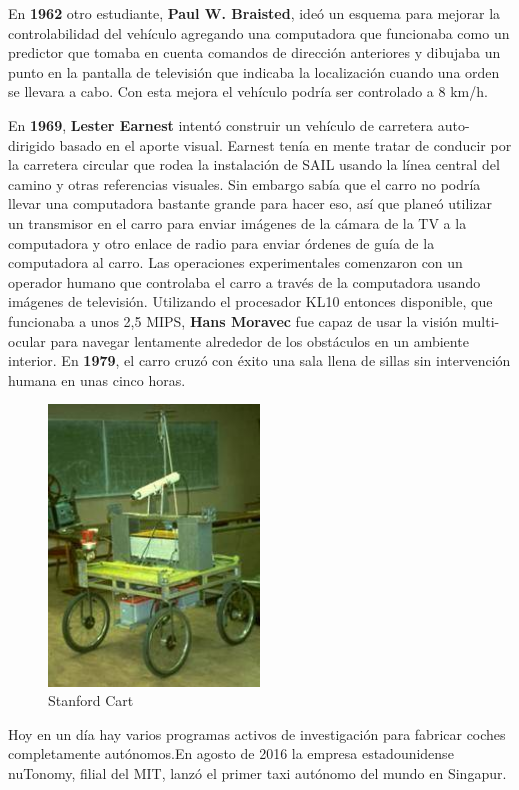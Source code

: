 \documentclass[a4paper, 11pt]{article} %
\begin{document}
En \textbf{1962} otro estudiante, \textbf{Paul W. Braisted}, ideó un esquema para mejorar la controlabilidad del vehículo agregando una computadora que funcionaba como un predictor que tomaba en cuenta comandos de dirección anteriores y dibujaba un punto en la pantalla de televisión que indicaba la localización cuando una orden se llevara a cabo. Con esta mejora el vehículo podría ser controlado a 8 km/h.

En \textbf{1969}, \textbf{Lester Earnest} intentó construir un vehículo de carretera auto-dirigido basado en el aporte visual. Earnest tenía en mente tratar de conducir por la carretera circular que rodea la instalación de SAIL usando la línea central del camino y otras referencias visuales. Sin embargo sabía que el carro no podría llevar una computadora bastante grande para hacer eso, así que planeó utilizar un transmisor en el carro para enviar imágenes de la cámara de la TV a la computadora y otro enlace de radio para enviar órdenes de guía de la computadora al carro. Las operaciones experimentales comenzaron con un operador humano que controlaba el carro a través de la computadora usando imágenes de televisión. Utilizando el procesador KL10 entonces disponible, que funcionaba a unos 2,5 MIPS, \textbf{Hans Moravec} fue capaz de usar la visión multi-ocular para navegar lentamente alrededor de los obstáculos en un ambiente interior.
En \textbf{1979}, el carro cruzó con éxito una sala llena de sillas sin intervención humana en unas cinco horas.
\begin{figure}[H]
	\centering
	\includegraphics[width=0.5\textwidth]{stanford_cart.jpg}
	\caption{Stanford Cart}
	\label{Stanford Cart}
\end{figure}
Hoy en un día hay varios programas activos de investigación para fabricar coches completamente autónomos.En agosto de 2016 la empresa estadounidense nuTonomy, filial del MIT, lanzó el primer taxi autónomo del mundo en Singapur.
\end{document}
